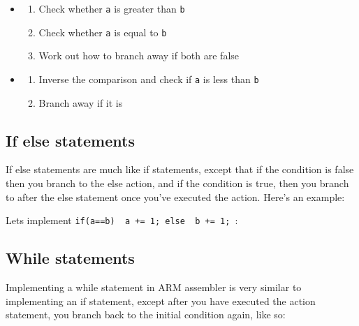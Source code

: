 \begin{itemize}
	\item 
	\begin{enumerate}
		\item Check whether {\tt a} is greater than {\tt b}
		\item Check whether {\tt a} is equal to {\tt b}
		\item Work out how to branch away if both are false
	\end{enumerate}
	\item 
	\begin{enumerate}
		\item Inverse the comparison and check if {\tt a} is less than {\tt b}
		\item Branch away if it is
	\end{enumerate}
\end{itemize}

\subsection{If else statements}

If else statements are much like if statements, except that if the condition is
false then you branch to the else action, and if the condition is true, then you
branch to after the else statement once you've executed the action. Here's an
example:

Lets implement {\tt if(a==b) { a += 1;} else { b += 1; }}:


\subsection{While statements}

Implementing a while statement in ARM assembler is very similar to implementing
an if statement, except after you have executed the action statement, you branch
back to the initial condition again, like so:


